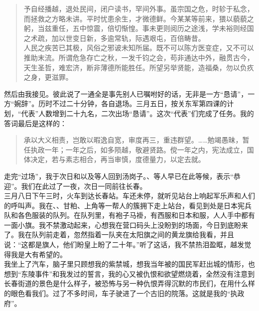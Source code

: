 \begin{quote}
	予自经播越，退处民间，闭户读书，罕间外事。虽宗国之危，时轸于私念，而拯救之方略未讲。平时忧患余生，才微德鲜。今某某等前来，猥以藐藐之躬，当兹重任，五中惊震，倍切惭惶。事未更则阅历之途浅，学未裕则经国之术疏，加以世变日新，多逾常轨，际遇艰屯，百倍畴昔。\\

人民之疾苦已其极，风俗之邪诐未知所届。既不可以陈方医变症，又不可以推助末流。所谓危急存亡之秋，一发千钧之会，苟非通达中外，融贯古今，天生圣哲，难宏济，断非薄德所能胜任。所望另举贤能，造福桑，勿以负疚之身，更滋罪。\\
\end{quote}

然后由我接见。彼此说了一通全是事先别人已嘱咐好的话，无非是一方“恳请”，一方“婉辞”。历时不过二十分钟，各自退场。三月五日，按关东军第四课的计划，“代表”人数增到二十九名，二次出场“恳请”。这次“代表”们完成了任务。我的答词最后是这样的：\\

\begin{quote}
	承以大义相责，岂敢以暇逸自宽，审度再三，重违群望。……勉竭愚昧，暂任执政一年；一年之后，如多陨越，敬避贤路。傥一年之内，宪法成立，国体决定，若与素志相合，再当审慎，度德量力，以定去就。\\
\end{quote}

走完“过场”，我于次日和以及等人回到汤岗子。、等人早已在此等候，表示“恭迎”。我们在此过了一夜，次日一同前往长春。\\

三月八日下午三时，火车到达长春站。车还未停，就听见站台上响起军乐声和人们的呼叫声。我在、、甘粕、上角等一帮人的簇拥下走上站台，看见到处是日本宪兵队和各色服装的队列。在队列里，有袍子马褂，有西服和日本和服，人人手中都有一面小旗。我不禁激动起来，心想我在营口码头上没盼到的场面，今日到底盼来了。我在队列前走着，忽然指着一队夹在太阳旗之间的黄龙旗给我看，并且说：“这都是旗人，他们盼皇上盼了二十年。”听了这话，我不禁热泪盈眶，越发觉得我是大有希望的。\\

我坐上了汽车，脑子里只顾想我的紫禁城，想我当年被的国民军赶出城的情形，也想到“东陵事件”和我发过的誓言，我的心又被仇恨和欲望燃烧着，全然没有注意到长春街道的景色是什么样子，被恐怖与另一种仇恨弄得沉默的市民们，在用什么样的眼色看我们。过了不多时间，车子驶进了一个古旧的院落。这就是我的“执政府”。\\

